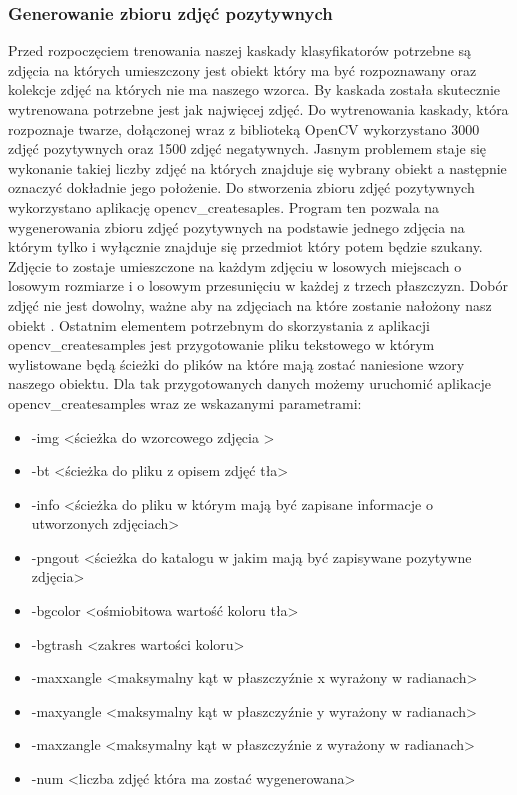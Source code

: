 \subsubsection{Generowanie zbioru zdjęć pozytywnych}\label{sec:generowanieZdjec}
Przed rozpoczęciem trenowania naszej kaskady klasyfikatorów potrzebne są zdjęcia na których umieszczony jest  obiekt który ma być rozpoznawany oraz kolekcje zdjęć na których nie ma naszego wzorca. By kaskada została skutecznie wytrenowana potrzebne jest jak najwięcej zdjęć. Do wytrenowania kaskady, która rozpoznaje twarze, dołączonej wraz z biblioteką OpenCV wykorzystano 3000 zdjęć pozytywnych oraz 1500 zdjęć negatywnych. Jasnym problemem staje się wykonanie takiej liczby zdjęć na których znajduje się wybrany obiekt a następnie oznaczyć dokładnie jego położenie. Do stworzenia zbioru zdjęć pozytywnych wykorzystano aplikację opencv\_createsaples. Program ten pozwala na wygenerowania zbioru zdjęć pozytywnych na podstawie jednego zdjęcia na którym tylko i wyłącznie znajduje się przedmiot który potem będzie szukany. Zdjęcie to zostaje umieszczone na każdym zdjęciu w losowych miejscach o losowym rozmiarze i o losowym przesunięciu w każdej z trzech płaszczyzn. Dobór zdjęć nie jest dowolny, ważne aby na zdjęciach na które zostanie nałożony nasz obiekt . Ostatnim elementem potrzebnym do skorzystania z aplikacji opencv\_createsamples jest przygotowanie pliku tekstowego w którym wylistowane będą ścieżki do plików na które mają zostać naniesione wzory naszego obiektu. Dla tak przygotowanych danych możemy uruchomić aplikacje opencv\_createsamples wraz ze wskazanymi parametrami:
\begin{itemize}
	\item -img \textless ścieżka do wzorcowego zdjęcia \textgreater
	\item -bt \textless ścieżka do pliku z opisem zdjęć tła\textgreater
	\item -info \textless ścieżka do pliku w którym mają być zapisane informacje o utworzonych zdjęciach\textgreater
	\item -pngout \textless ścieżka do katalogu w jakim mają być zapisywane pozytywne zdjęcia\textgreater
	\item -bgcolor \textless ośmiobitowa wartość koloru tła\textgreater
	\item -bgtrash \textless zakres wartości koloru\textgreater
	\item -maxxangle \textless maksymalny kąt w płaszczyźnie x wyrażony w radianach\textgreater
	\item -maxyangle \textless maksymalny kąt w płaszczyźnie y wyrażony w radianach\textgreater
	\item -maxzangle \textless maksymalny kąt w płaszczyźnie z wyrażony w radianach\textgreater
	\item -num \textless liczba zdjęć która ma zostać wygenerowana>
	
\end{itemize}

